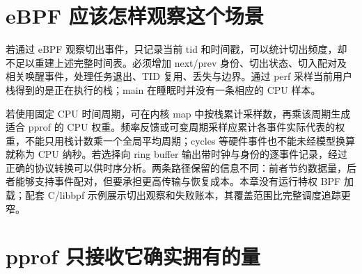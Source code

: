 \documentclass[UTF8,fontset=fandol,openany,11pt]{ctexbook}
\begin{document}
\section{eBPF 应该怎样观察这个场景}

若通过 eBPF 观察切出事件，只记录当前 tid 和时间戳，可以统计切出频度，却不足以重建上述完整时间表。必须增加 next/prev 身份、切出状态、切入配对及相关唤醒事件，处理任务退出、TID 复用、丢失与边界。通过 perf 采样当前用户栈得到的是正在执行的栈；main 在睡眠时并没有一条相应的 CPU 样本。\cite{eb-sched-trace}\cite{eb-sched-core}\cite{eb-stack-helper}


若使用固定 CPU 时间周期，可在内核 map 中按栈累计采样数，再乘该周期生成适合 pprof 的 CPU 权重。频率反馈或可变周期采样应累计各事件实际代表的权重，不能只用栈计数乘一个全局平均周期；cycles 等硬件事件也不能未经模型换算就称为 CPU 纳秒。若选择向 ring buffer 输出带时钟与身份的逐事件记录，经过正确的协议转换可以供时序分析。两条路径保留的信息不同：前者节约数据量，后者能够支持事件配对，但要承担更高传输与恢复成本。本章没有运行特权 BPF 加载；配套 C/libbpf 示例展示切出观察和失败账本，其覆盖范围比完整调度追踪更窄。\cite{eb-ring-doc}\cite{eb-perf-abi}


\section{pprof 只接收它确实拥有的量}
\end{document}
